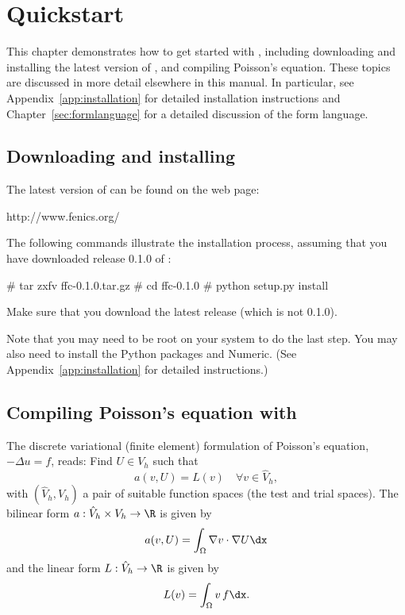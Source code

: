 \chapter{Quickstart}

This chapter demonstrates how to get started with \ffc{}, including
downloading and installing the latest version of \ffc{}, and compiling
Poisson's equation. These topics are discussed in more detail
elsewhere in this manual. In particular, see
Appendix~\ref{app:installation} for detailed installation instructions
and Chapter~\ref{sec:formlanguage} for a detailed discussion of the
form language.

\section{Downloading and installing \ffc{}}

The latest version of \ffc{} can be found on the \fenics{} web page:
\begin{code}
http://www.fenics.org/
\end{code}
The following commands illustrate the installation process, assuming
that you have downloaded release 0.1.0 of \ffc{}:
\begin{code}
# tar zxfv ffc-0.1.0.tar.gz
# cd ffc-0.1.0
# python setup.py install
\end{code}
Make sure that you download the latest release (which is not 0.1.0).

Note that you may need to be root on your system to do the last
step. You may also need to install the Python packages \fiat{} and
Numeric. (See Appendix~\ref{app:installation} for detailed instructions.)

\section{Compiling Poisson's equation with \ffc{}}

The discrete variational (finite element) formulation of Poisson's
equation, $-\Delta u = f$, reads: Find $U \in V_h$ such that
\begin{equation} \label{eq:varform}
  a(v, U) = L(v) \quad \forall v\in \hat{V}_h, 
\end{equation}
with $(\hat{V}_h, V_h)$ a pair of suitable function spaces (the test and
trial spaces). The bilinear form $a : \hat{V}_h \times V_h \rightarrow
\R$ is given by
\begin{equation}
  a(v, U) = \int_{\Omega} \nabla v \cdot \nabla U \dx
\end{equation}
and the linear form $L : \hat{V}_h \rightarrow \R$ is given by
\begin{equation}
  L(v) = \int_{\Omega} v \, f \dx.
\end{equation}

